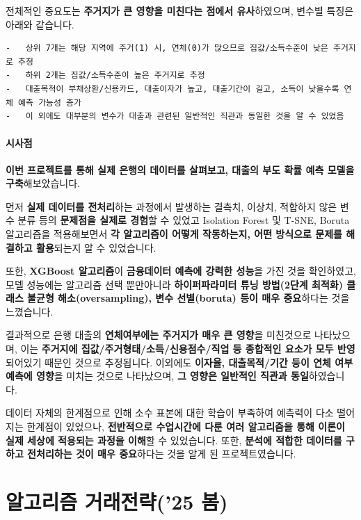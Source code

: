 \documentclass[
  a4paper,
  DIV=11,
  numbers=noendperiod]{scrreprt}
\begin{document}
\newpage

전체적인 중요도는 \textbf{주거지가 큰 영향을 미친다는 점에서
유사}하였으며, 변수별 특징은 아래와 같습니다.

\begin{verbatim}
-   상위 7개는 해당 지역에 주거(1) 시, 연체(0)가 많으므로 집값/소득수준이 낮은 주거지로 추정
-   하위 2개는 집값/소득수준이 높은 주거지로 추정
-   대출목적이 부채상환/신용카드, 대출이자가 높고, 대출기간이 길고, 소득이 낮을수록 연체 예측 가능성 증가
-   이 외에도 대부분의 변수가 대출과 관련된 일반적인 직관과 동일한 것을 알 수 있었음
\end{verbatim}

\subsection*{시사점}\label{uxc2dcuxc0acuxc810}

\textbf{이번 프로젝트를 통해 실제 은행의 데이터를 살펴보고, 대출의 부도
확률 예측 모델을 구축}해보았습니다.

먼저 \textbf{실제 데이터를 전처리}하는 과정에서 발생하는 결측치, 이상치,
적합하지 않은 변수 분류 등의 \textbf{문제점을 실제로 경험}할 수 있었고
Isolation Forest 및 T-SNE, Boruta 알고리즘을 적용해보면서 \textbf{각
알고리즘이 어떻게 작동하는지, 어떤 방식으로 문제를 해결하고 활용}되는지
알 수 있었습니다.

또한, \textbf{XGBoost 알고리즘}이 \textbf{금융데이터 예측에 강력한
성능}을 가진 것을 확인하였고, 모델 성능에는 알고리즘 선택 뿐만아니라
\textbf{하이퍼파라미터 튜닝 방법(2단계 최적화) 클래스 불균형
해소(oversampling), 변수 선별(boruta) 등이 매우 중요}하다는 것을
느꼈습니다.

결과적으로 은행 대출의 \textbf{연체여부에는 주거지가 매우 큰 영향}을
미친것으로 나타났으며, 이는 \textbf{주거지에
집값/주거형태/소득/신용점수/직업 등 종합적인 요소가 모두 반영}되어있기
때문인 것으로 추정됩니다. 이외에도 \textbf{이자율, 대출목적/기간 등이
연체 여부 예측에 영향}을 미치는 것으로 나타났으며, \textbf{그 영향은
일반적인 직관과 동일}하였습니다.

데이터 자체의 한계점으로 인해 소수 표본에 대한 학습이 부족하여 예측력이
다소 떨어지는 한계점이 있었으나, \textbf{전반적으로 수업시간에 다룬 여러
알고리즘을 통해 이론이 실제 세상에 적용되는 과정을 이해}할 수
있었습니다. 또한, \textbf{분석에 적합한 데이터를 구하고 전처리하는 것이
매우 중요}하다는 것을 알게 된 프로젝트였습니다.

\part{알고리즘 거래전략('25 봄)}
\end{document}
